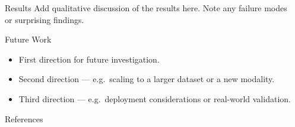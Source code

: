 \documentclass[final]{beamer}
\newlength{\sepwidth}
\newlength{\colwidth}
\newcommand{\separatorcolumn}{\begin{column}{\sepwidth}\end{column}}
\begin{document}
\begin{frame}[t]
\begin{columns}[t]
\begin{column}{\colwidth}
\begin{block}{Results}
    Add qualitative discussion of the results here.  Note any
    failure modes or surprising findings.

  \end{block}

  \begin{block}{Future Work}

    \begin{itemize}
      \item First direction for future investigation.
      \item Second direction --- e.g.\ scaling to a larger dataset
        or a new modality.
      \item Third direction --- e.g.\ deployment considerations
        or real-world validation.
    \end{itemize}

  \end{block}

  \begin{block}{References}

    \nocite{*}
    \footnotesize{}

  \end{block}

\end{column}

\separatorcolumn
\end{columns}
\end{frame}
\end{document}
